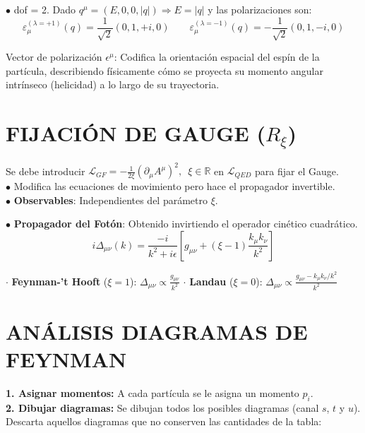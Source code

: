 $\bullet$ dof = 2. \quad Dado $q^\mu = (E, 0,0,|q|) \Rightarrow E = |q|$ y las polarizaciones son: \\$$\varepsilon^{(\lambda=+1)}_\mu(q) = \frac{1}{\sqrt{2}}(0,1,+i,0) \qquad \varepsilon_\mu^{(\lambda=-1)}(q) = -\frac{1}{\sqrt{2}}(0,1,-i,0)$$

Vector de polarización $\epsilon^\mu$: Codifica la orientación espacial del espín de la partícula, describiendo físicamente cómo se proyecta su momento angular intrínseco (helicidad) a lo largo de su trayectoria.

\section{FIJACIÓN DE GAUGE ($R_\xi$)}
Se debe introducir  $ \mathcal{L}_{GF} = -\frac{1}{2\xi}(\partial_\mu A^\mu)^2,\;\ \xi \in \mathbb{R}$
en $\mathcal{L}_{QED}$ para fijar el Gauge.\\

$\bullet$ Modifica las ecuaciones de movimiento pero hace el propagador invertible.\\ 
$\bullet$ \textbf{Observables}: Independientes del parámetro $\xi$.

$\bullet$ \textbf{Propagador del Fotón}: Obtenido invirtiendo el operador cinético cuadrático.
$$i\Delta_{\mu\nu}(k) = \frac{-i}{k^2 + i\epsilon} \left[ g_{\mu\nu} + (\xi - 1)\frac{k_\mu k_\nu}{k^2} \right]$$

$\cdot$ \textbf{Feynman-'t Hooft} ($\xi = 1$):
   $\Delta_{\mu\nu} \propto \frac{g_{\mu\nu}}{k^2} $ \quad $\cdot$ \textbf{Landau} ($\xi = 0$):
   $\Delta_{\mu\nu} \propto \frac{g_{\mu\nu} - k_\mu k_\nu/k^2}{k^2}$



\section{ANÁLISIS DIAGRAMAS DE FEYNMAN}
\textbf{1. Asignar momentos:} A cada partícula se le asigna un momento $p_i$.\\
\textbf{2. Dibujar diagramas:} Se dibujan todos los posibles diagramas (canal $s$, $t$ y $u$). \\
Descarta aquellos diagramas que no conserven las cantidades de la tabla:

